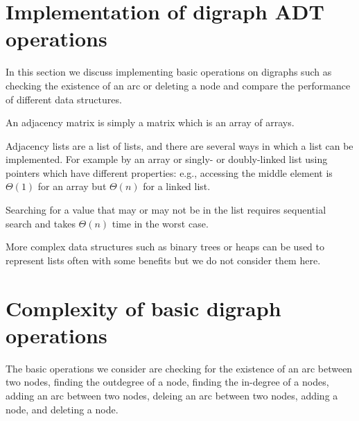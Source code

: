 %
%
%
%
%
%
%

\section{Implementation of digraph ADT operations}
\label{sec:graphadtimpl}

In this section we discuss implementing basic operations on digraphs such as checking the existence of an arc or deleting a node and compare the performance of different data structures.



An adjacency matrix is simply a matrix which is an array of arrays. 

Adjacency lists are a list of lists, and there are several ways in which a list can be implemented. For
example by an array or singly- or doubly-linked list using pointers which
have different properties: e.g., accessing the middle element is $\Theta(1)$ for an array but
$\Theta(n)$ for a linked list. 

Searching for  a value that may or may not be in the list requires sequential search
and takes $\Theta(n)$ time in the worst case. 

More complex data structures such as binary trees or heaps can be used to represent lists often with some benefits  but we do not consider them here. 

\section{Complexity of basic digraph operations}
The basic operations we consider are checking for the existence of an arc between two nodes, finding the outdegree of a node, finding the in-degree of  a nodes, adding an arc between two nodes, deleing an arc between two nodes, adding a node, and deleting a node. 

